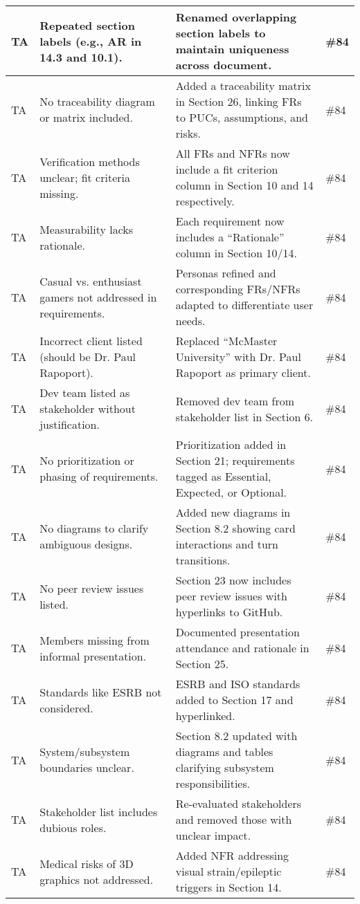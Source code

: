 \documentclass{article}
\begin{document}
\begin{longtable}{|p{2cm}|p{5cm}|p{5cm}|p{2cm}|}
\hline
TA & Repeated section labels (e.g., AR in 14.3 and 10.1). & Renamed overlapping section labels to maintain uniqueness across document. & \#84 \\
\hline
TA & No traceability diagram or matrix included. & Added a traceability matrix in Section 26, linking FRs to PUCs, assumptions, and risks. & \#84 \\
\hline
TA & Verification methods unclear; fit criteria missing. & All FRs and NFRs now include a fit criterion column in Section 10 and 14 respectively. & \#84 \\
\hline
TA & Measurability lacks rationale. & Each requirement now includes a “Rationale” column in Section 10/14. & \#84 \\
\hline
TA & Casual vs. enthusiast gamers not addressed in requirements. & Personas refined and corresponding FRs/NFRs adapted to differentiate user needs. & \#84 \\
\hline
TA & Incorrect client listed (should be Dr. Paul Rapoport). & Replaced “McMaster University” with Dr. Paul Rapoport as primary client. & \#84 \\
\hline
TA & Dev team listed as stakeholder without justification. & Removed dev team from stakeholder list in Section 6. & \#84 \\
\hline
TA & No prioritization or phasing of requirements. & Prioritization added in Section 21; requirements tagged as Essential, Expected, or Optional. & \#84 \\
\hline
TA & No diagrams to clarify ambiguous designs. & Added new diagrams in Section 8.2 showing card interactions and turn transitions. & \#84 \\
\hline
TA & No peer review issues listed. & Section 23 now includes peer review issues with hyperlinks to GitHub. & \#84 \\
\hline
TA & Members missing from informal presentation. & Documented presentation attendance and rationale in Section 25. & \#84 \\
\hline
TA & Standards like ESRB not considered. & ESRB and ISO standards added to Section 17 and hyperlinked. & \#84 \\
\hline
TA & System/subsystem boundaries unclear. & Section 8.2 updated with diagrams and tables clarifying subsystem responsibilities. & \#84 \\
\hline
TA & Stakeholder list includes dubious roles. & Re-evaluated stakeholders and removed those with unclear impact. & \#84 \\
\hline
TA & Medical risks of 3D graphics not addressed. & Added NFR addressing visual strain/epileptic triggers in Section 14. & \#84 \\

\end{longtable}
\end{document}
